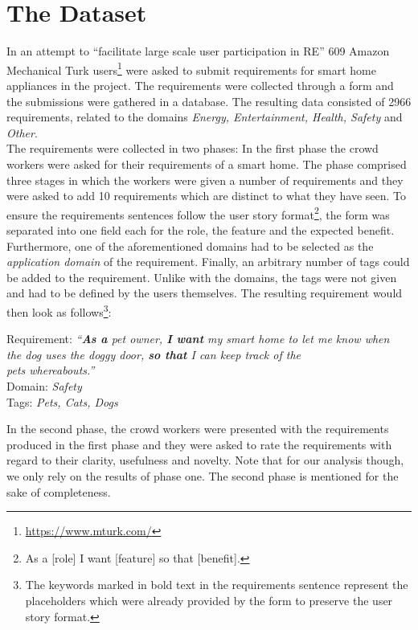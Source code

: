 \section{The \crowdre{} Dataset}
In an attempt to “facilitate large scale user participation in RE” \cite{murukannaiah_toward_2017} 609 Amazon Mechanical Turk users\footnote{\url{https://www.mturk.com/}} were asked to submit requirements for smart home appliances in the \crowdre{} project. The requirements were collected through a form and the submissions were gathered in a database. The resulting data consisted of 2966 requirements, related to the domains \emph{Energy, Entertainment, Health, Safety} and \emph{Other}.\\

The requirements were collected in two phases: In the first phase the crowd workers were asked for their requirements of a smart home. The phase comprised three stages in which the workers were given a number of requirements and they were asked to add 10 requirements which are distinct to what they have seen. To ensure the requirements sentences follow the user story format\footnote{As a [role] I want [feature] so that [benefit].}, the form was separated into one field each for the role, the feature and the expected benefit. Furthermore, one of the aforementioned domains had to be selected as the \emph{application domain} of the requirement. Finally, an arbitrary number of tags could be added to the requirement. Unlike with the domains, the tags were not given and had to be defined by the users themselves. The resulting requirement would then look as follows\footnote{The keywords marked in bold text in the requirements sentence represent the placeholders which were already provided by the form to preserve the user story format.}:

\begin{tabbing}
Requirement: \= \textit{``\textbf{As a} pet owner, \textbf{I want} my smart home to let me know when}\\
\>\textit{the dog uses the doggy door, \textbf{so that} I can keep track of the}\\ \>\textit{pets whereabouts.''}\\
Domain:\> \textit{Safety}\\
Tags:\> \textit{Pets, Cats, Dogs}
\end{tabbing}

In the second phase, the crowd workers were presented with the requirements produced in the first phase and they were asked to rate the requirements with regard to their clarity, usefulness and novelty. Note that for our analysis though, we only rely on the results of phase one. The second phase is mentioned for the sake of completeness.